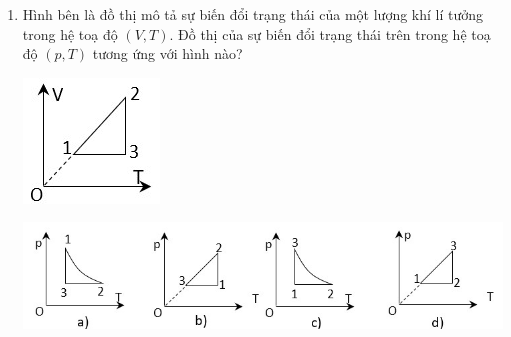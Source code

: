 \begin{enumerate}[label=\bfseries Câu \arabic*:, leftmargin=1.7cm]
\item Hình bên là đồ thị mô tả sự biến đổi trạng thái của một lượng khí lí tưởng trong hệ toạ độ $\left(V, T\right)$. Đồ thị của sự biến đổi trạng thái trên trong hệ toạ độ $\left(p, T\right)$ tương ứng với hình nào?
\begin{center}
	\includegraphics[width=0.2\linewidth]{../figs/VN12-Y24-PH-SYL-016-7}
\end{center}
\begin{center}
	\includegraphics[width=0.9\linewidth]{../figs/VN12-Y24-PH-SYL-016-8}
\end{center}


\end{enumerate}
